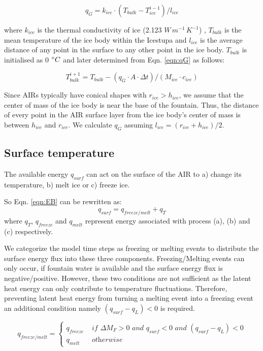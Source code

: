 \documentclass[utf8]{frontiersSCNS} %
\begin{document}
\begin{equation} q_{G} = k_{ice} \cdot (T_{bulk}-T_{ice}^{i-1})/l_{ice} \label{eqn:qG}    \end{equation}

where $k_{ice}$ is the thermal conductivity of ice (2.123 $W\, m^{-1}\,K^{-1}$) , $T_{bulk}$ is the mean temperature of
the ice body within the Icestupa and $l_{ice}$ is the average distance of any point in the surface to any other point in
the ice body. $T_{bulk}$ is initialised as 0 $\degree C$ and later determined from Eqn. \ref{eqn:qG} as follows:

\begin{equation} T_{bulk}^{i+1} = T_{bulk} - (q_{G} \cdot A \cdot \Delta t)/(M_{ice} \cdot c_{ice}) \end{equation}

Since AIRs typically have conical shapes with $r_{ice} > h_{ice}$, we assume that the center of mass of the ice body is
near the base of the fountain. Thus, the distance of every point in the AIR surface layer from the ice body's center of
mass is between $h_{ice}$ and $r_{ice}$. We calculate $q_{G}$ assuming $l_{ice} = (r_{ice} + h_{ice})/2$.

\subsection{Surface temperature}

The available energy $q_{surf}$ can act on the surface of the AIR to a) change its temperature, b) melt ice or c) freeze
ice.

So Eqn. \ref{eqn:EB} can be rewritten as: \begin{equation} q_{surf} = q_{freeze/melt} + q_{T} \end{equation} where
$q_{T}$, $q_{freeze}$ and $q_{melt}$ represent energy associated with process (a), (b) and (c) respectively.

We categorize the model time steps as freezing or melting events to distribute the surface energy flux into these three
components. Freezing/Melting events can only occur, if fountain water is available and the surface energy flux is
negative/positive. However, these two conditions are not sufficient as the latent heat energy can only contribute to
temperature fluctuations. Therefore, preventing latent heat energy from turning a melting event into a freezing event an
additional condition namely $(q_{surf}-q_{L}) < 0$ is required.

\begin{equation}
	q_{freeze/melt} = \left\{ \begin{array}{ll}
		q_{freeze} & \textit{ if } \Delta M_{F} > 0 \textit{ and } q_{surf} < 0 \textit{ and }(q_{surf}-q_{L}) < 0 \\
		q_{melt}   & \textit{ otherwise}
	\end{array} \right.
\end{equation}
\end{document}
